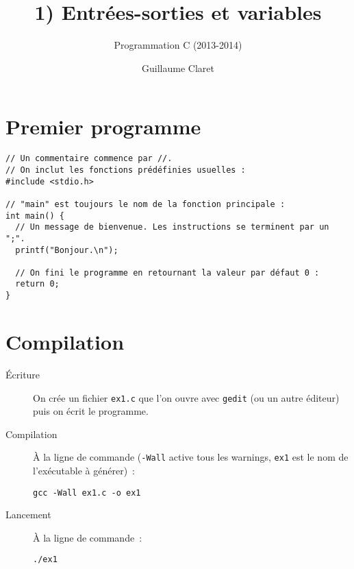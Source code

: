 \documentclass[a4paper,10pt]{article}
\begin{document}
  \title{1) Entrées-sorties et variables}
  \author{Programmation C (2013-2014)}
  \date{Guillaume Claret}
  \maketitle
  
  \section{Premier programme}
  \begin{verbatim}
// Un commentaire commence par //.
// On inclut les fonctions prédéfinies usuelles :
#include <stdio.h>

// "main" est toujours le nom de la fonction principale :
int main() {
  // Un message de bienvenue. Les instructions se terminent par un ";".
  printf("Bonjour.\n");
  
  // On fini le programme en retournant la valeur par défaut 0 :
  return 0;
}
  \end{verbatim}
  
  \section{Compilation}
  \begin{description}
    \item[Écriture] On crée un fichier \texttt{ex1.c} que l'on ouvre avec \texttt{gedit} (ou un autre éditeur) puis on écrit le programme.
    \item[Compilation] À la ligne de commande (\texttt{-Wall} active tous les warnings, \texttt{ex1} est le nom de l'exécutable à générer)~:
      \begin{verbatim}
gcc -Wall ex1.c -o ex1
      \end{verbatim}
    \item[Lancement] À la ligne de commande~:
      \begin{verbatim}
./ex1
      \end{verbatim}
  \end{description}
  
\end{document}
